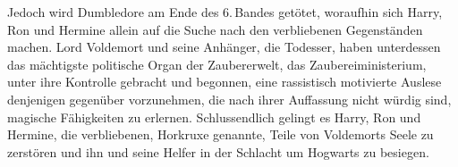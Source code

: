 Jedoch wird Dumbledore am Ende des 6.\,Bandes getötet, woraufhin sich Harry, Ron und Hermine allein auf die Suche nach den verbliebenen Gegenständen machen. Lord Voldemort und seine Anhänger, die Todesser, haben unterdessen das mächtigste politische Organ der Zaubererwelt, das Zaubereiministerium, unter ihre Kontrolle gebracht und begonnen, eine rassistisch motivierte \glqq Auslese\grqq{} denjenigen gegenüber vorzunehmen, die nach ihrer Auffassung nicht würdig sind, magische Fähigkeiten zu erlernen. 
Schlussendlich gelingt es Harry, Ron und Hermine, die verbliebenen, Horkruxe genannte, Teile von Voldemorts Seele zu zerstören und ihn und seine Helfer in der \glqq Schlacht um Hogwarts\grqq{} zu besiegen.
